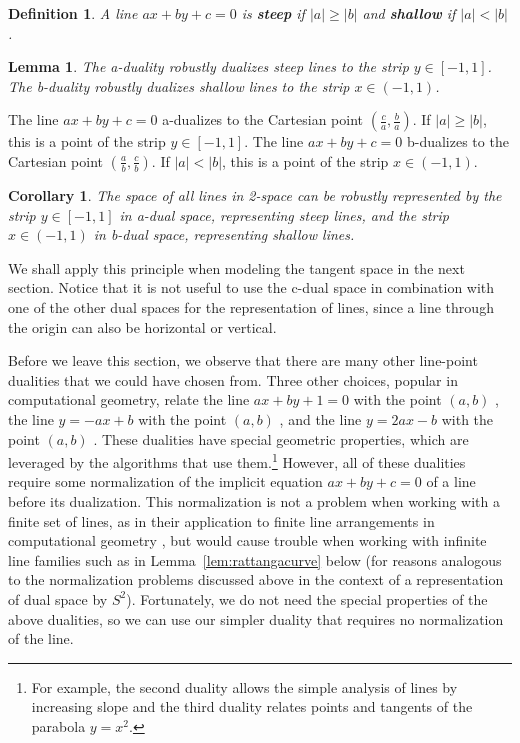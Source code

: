 \documentclass[12pt]{article}
\newcommand{\QED}{\vrule height 1.4ex width 1.0ex depth -.1ex\ \vspace{.3in}} %
\newcommand{\prf}{\noindent{{\bf Proof}:\ \ \ }}
\newtheorem{lemma}[theorem]{Lemma}
\newtheorem{corollary}[theorem]{Corollary}
\newtheorem{defn2}[theorem]{Definition}
\begin{document}
\begin{defn2}
\label{defn:steep}
A line $ax+by+c=0$ is {\bf steep} if $|a| \geq |b|$
and {\bf shallow} if $|a| < |b|$.
\end{defn2}

\begin{lemma}
\label{lem:steep}
The a-duality robustly dualizes steep lines to the strip $y \in [-1,1]$.
The b-duality robustly dualizes shallow lines to the strip $x \in (-1,1)$.
\end{lemma}
\prf
The line $ax+by+c=0$ a-dualizes to the Cartesian point $(\frac{c}{a}, \frac{b}{a})$.
If $|a| \geq |b|$, this is a point of the strip $y \in [-1,1]$.
The line $ax+by+c=0$ b-dualizes to the Cartesian point $(\frac{a}{b}, \frac{c}{b})$.
If $|a| < |b|$, this is a point of the strip $x \in (-1,1)$.
\QED

\vspace{-.2in}

\begin{corollary}
The space of all lines in 2-space can be robustly represented by
the strip $y \in [-1,1]$ in a-dual space, representing steep lines,
and the strip $x \in (-1,1)$ in b-dual space, representing shallow lines.
\end{corollary}

We shall apply this principle when modeling the tangent space in the 
next section.
Notice that it is not useful to use the c-dual space in combination
with one of the other dual spaces for the representation of lines, 
since a line through the origin can also be horizontal or vertical.

Before we leave this section, we observe that there are many other line-point dualities 
that we could have chosen from.
Three other choices, popular in computational geometry,
relate the line $ax+by+1=0$ with the point $(a,b)$ \cite{chazelle85}, %
the line $y = -ax + b$ with the point $(a,b)$ \cite{welzl85}, %
and the line $y=2ax-b$ with the point $(a,b)$ \cite{orourke94}.	%
These dualities have special geometric properties, 
which are leveraged by the algorithms that use them.\footnote{For example, 
	the second duality allows the simple analysis of lines by increasing slope
	and the third duality relates points and tangents of the parabola $y=x^2$.}
However, all of these dualities require some normalization of the
implicit equation $ax+by+c=0$ of a line before its dualization.
This normalization is not a problem when working with a finite set of lines,
as in their application to finite line arrangements in computational geometry
\cite{chazelle85,edels87,orourke94,welzl85},
but would cause trouble when working with infinite line families
such as in Lemma~\ref{lem:rattangacurve} below
(for reasons analogous to the normalization problems discussed above in the context
of a representation of dual space by $S^2$).
Fortunately, we do not need the special properties of the above dualities, 
so we can use our simpler duality that requires no normalization of the line.
\end{document}
